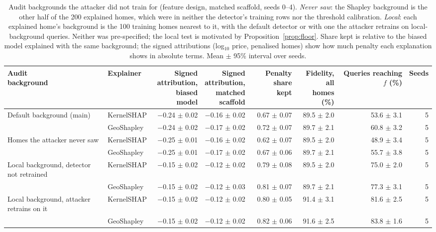 \begin{table}[t]
\centering
\footnotesize
\setlength{\tabcolsep}{3.5pt}
\begin{adjustbox}{max width=\linewidth}
\begin{tabular}{llrrrrrr}
\toprule
\makecell[b]{Audit \\ background} & Explainer & \makecell[b]{Signed \\ attribution, \\ biased model} & \makecell[b]{Signed \\ attribution, \\ matched \\ scaffold} & \makecell[b]{Penalty share \\ kept} & \makecell[b]{Fidelity, all \\ homes (\%)} & \makecell[b]{Queries \\ reaching $f$ \\ (\%)} & Seeds \\
\midrule
Default background (main) & KernelSHAP & $-$0.24 $\pm$ 0.02 & $-$0.16 $\pm$ 0.02 & 0.67 $\pm$ 0.07 & 89.5 $\pm$ 2.0 & 53.6 $\pm$ 3.1 & 5 \\
 & GeoShapley & $-$0.24 $\pm$ 0.02 & $-$0.17 $\pm$ 0.02 & 0.72 $\pm$ 0.07 & 89.7 $\pm$ 2.1 & 60.8 $\pm$ 3.2 & 5 \\
\midrule
Homes the attacker never saw & KernelSHAP & $-$0.25 $\pm$ 0.01 & $-$0.16 $\pm$ 0.02 & 0.62 $\pm$ 0.07 & 89.5 $\pm$ 2.0 & 48.9 $\pm$ 3.4 & 5 \\
 & GeoShapley & $-$0.25 $\pm$ 0.01 & $-$0.17 $\pm$ 0.02 & 0.67 $\pm$ 0.06 & 89.7 $\pm$ 2.1 & 55.7 $\pm$ 3.8 & 5 \\
\midrule
Local background, detector not retrained & KernelSHAP & $-$0.15 $\pm$ 0.02 & $-$0.12 $\pm$ 0.02 & 0.79 $\pm$ 0.08 & 89.5 $\pm$ 2.0 & 75.0 $\pm$ 2.0 & 5 \\
 & GeoShapley & $-$0.15 $\pm$ 0.02 & $-$0.12 $\pm$ 0.03 & 0.81 $\pm$ 0.07 & 89.7 $\pm$ 2.1 & 77.3 $\pm$ 3.1 & 5 \\
\midrule
Local background, attacker retrains on it & KernelSHAP & $-$0.15 $\pm$ 0.02 & $-$0.12 $\pm$ 0.02 & 0.80 $\pm$ 0.05 & 91.4 $\pm$ 3.1 & 81.6 $\pm$ 2.5 & 5 \\
 & GeoShapley & $-$0.15 $\pm$ 0.02 & $-$0.12 $\pm$ 0.02 & 0.82 $\pm$ 0.06 & 91.6 $\pm$ 2.5 & 83.8 $\pm$ 1.6 & 5 \\
\bottomrule
\end{tabular}
\end{adjustbox}
\caption{Audit backgrounds the attacker did not train for (feature design, matched scaffold, seeds 0--4). \emph{Never saw}: the Shapley background is the other half of the 200 explained homes, which were in neither the detector's training rows nor the threshold calibration. \emph{Local}: each explained home's background is the 100 training homes nearest to it, with the default detector or with one the attacker retrains on local-background queries. Neither was pre-specified; the local test is motivated by Proposition~\ref{prop:floor}. Share kept is relative to the biased model explained with the same background; the signed attributions (log$_{10}$ price, penalised homes) show how much penalty each explanation shows in absolute terms. Mean $\pm$ 95\% interval over seeds.}
\label{tab:local}
\end{table}
